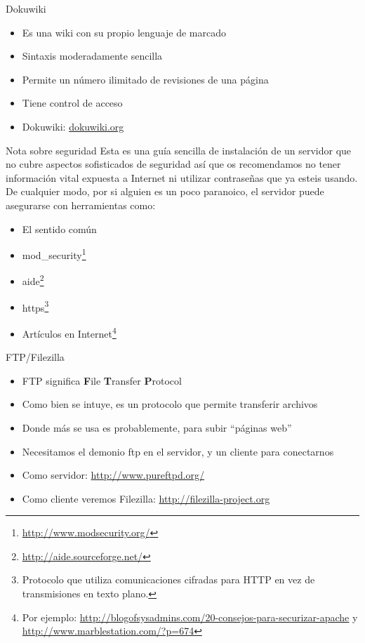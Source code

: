 \documentclass[spanish]{beamer}
\begin{document}
\begin{frame}{Dokuwiki}
\begin{itemize}
\item Es una wiki con su propio lenguaje de marcado
\item Sintaxis moderadamente sencilla
\item Permite un número ilimitado de revisiones de una página
\item Tiene control de acceso
\item Dokuwiki: \url{dokuwiki.org}
\end{itemize}
\end{frame}

\begin{frame}{Nota sobre seguridad}
Esta es una guía sencilla de instalación de un servidor que no cubre aspectos sofisticados de seguridad así que os recomendamos no tener información vital expuesta a Internet ni utilizar contraseñas que ya esteis usando. De cualquier modo, por si alguien es un poco paranoico, el servidor puede asegurarse con herramientas como:
\begin{itemize}
\item El sentido común
\item mod\_security\footnote{\url{http://www.modsecurity.org/}}
\item aide\footnote{\url{http://aide.sourceforge.net/}}
\item https\footnote{Protocolo que utiliza comunicaciones cifradas para HTTP en vez de transmisiones en texto plano.}
\item Artículos en Internet\footnote{Por ejemplo: \url{http://blogofsysadmins.com/20-consejos-para-securizar-apache} y \url{http://www.marblestation.com/?p=674}}
\end{itemize}
\end{frame}

\begin{frame}{FTP/Filezilla}
\begin{itemize}
\item FTP significa {\bf F}ile {\bf T}ransfer {\bf P}rotocol
\item Como bien se intuye, es un protocolo que permite transferir archivos
\item Donde más se usa es probablemente, para subir ``páginas web''
\item Necesitamos el demonio ftp en el servidor, y un cliente para conectarnos
\item Como servidor: \url{http://www.pureftpd.org/}
\item Como cliente veremos Filezilla: \url{http://filezilla-project.org}
\end{itemize}
\end{frame}
\end{document}

